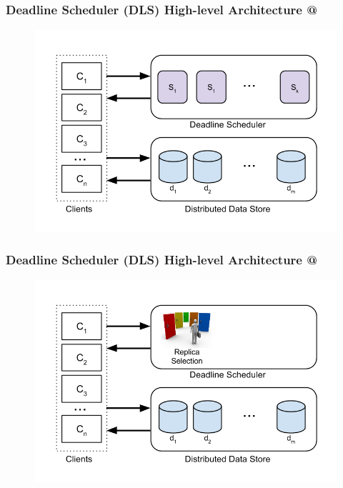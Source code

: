 \documentclass{beamer}
\makeatletter
\newcommand*{\rom}[1]{\expandafter\@slowromancap\romannumeral #1@}
\makeatother
\begin{document}
\begin{frame}
  \frametitle{Deadline Scheduler (DLS) High-level Architecture \rom{1}}
  \begin{figure}
    \begin{center}
      \centerline{\includegraphics[scale=0.44]{img/DLS_ARCH_1.png}}
    \end{center}
  \end{figure}
\end{frame}
\begin{frame}
  \frametitle{Deadline Scheduler (DLS) High-level Architecture \rom{2}}
  \begin{figure}
    \begin{center}
      \centerline{\includegraphics[scale=0.44]{img/DLS_ARCH_2.png}}
    \end{center}
  \end{figure}
\end{frame}
\end{document}

